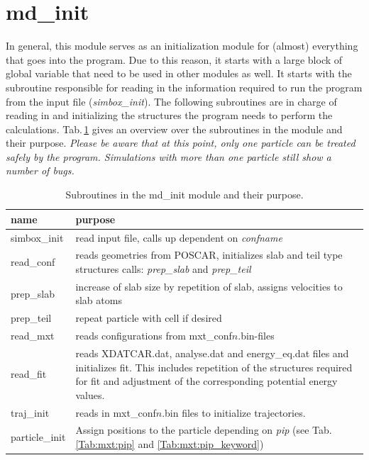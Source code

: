 \documentclass[twoside, 11pt, titlepage, captions=nooneline, a4paper, headsepline]{scrbook}%
\newcommand{\9}{\mathrm}
\newcommand{\0}{\,\mathrm}
\begin{document}
\section{md\_init}
In general, this module serves as an initialization module for (almost) everything that goes into the program. Due to this reason, it starts with a large block of global variable that need to be used in other modules as well.
It starts with the subroutine responsible for reading in the information required to run the program from the input file (\textit{simbox\_init}). The following subroutines are in charge of reading in and initializing the structures the program needs to perform the calculations. Tab.\,\ref{Tab:Funct:mdinit} gives an overview over the subroutines in the module and their purpose. 
\textit{Please be aware that at this point, only one particle can be treated safely by the program. Simulations with more than one particle still show a number of bugs.}
\begin{table}[b!]
\centering
\caption{Subroutines in the md\_init module and their purpose.}
\label{Tab:Funct:mdinit}
\begin{tabular}{l p{12cm}}
\hline\hline
name			&purpose			\\
\hline
simbox\_init & read input file, calls up dependent on \textit{confname}\\
read\_conf& reads geometries from POSCAR, initializes slab and teil type structures\newline
calls: \textit{prep\_slab} and \textit{prep\_teil} \\
prep\_slab& increase of slab size by repetition of slab, assigns velocities to slab atoms\\
prep\_teil& repeat particle with cell if desired\\
read\_mxt&reads configurations from mxt\_conf$n$.bin-files\\
read\_fit&reads XDATCAR.dat, analyse.dat and energy\_eq.dat files and initializes fit. This includes repetition of the structures required for fit and adjustment of the corresponding potential energy values.\\
traj\_init&reads in mxt\_conf$n$.bin files to initialize trajectories.\\
particle\_init& Assign positions to the particle depending on \textit{pip} (see Tab.\,\ref{Tab:mxt:pip} and \ref{Tab:mxt:pip_keyword})\\

\hline
\hline
\end{tabular}
\end{table}
\end{document}

